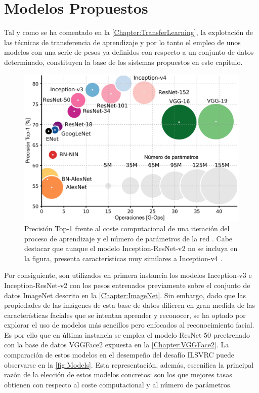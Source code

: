 \renewcommand{\itemautorefname}{Punto}

\chapter{Modelos Propuestos} \label{Chapter:5}

Tal y como se ha comentado en la \autoref{Chapter:TransferLearning}, la explotación de las técnicas de transferencia de aprendizaje y por lo tanto el empleo de unos modelos con una serie de pesos ya definidos con respecto a un conjunto de datos determinado, constituyen la base de los sistemas propuestos en este capítulo.

\begin{figure}
    \centering
    \includegraphics[scale=0.25]{Images/Models.png}
    \caption{Precisión Top-1 frente al coste computacional de una iteración del proceso de aprendizaje y el número de parámetros de la red \cite{Models}. Cabe destacar que aunque el modelo Inception-ResNet-v2 no se incluya en la figura, presenta características muy similares a Inception-v4 \cite{Inception-ResNet}.}
    \label{fig:Models}
\end{figure}

Por consiguiente, son utilizados en primera instancia los modelos Inception-v3 \cite{Inception-v3} e Inception-ResNet-v2 \cite{Inception-ResNet} con los pesos entrenados previamente sobre el conjunto de datos ImageNet descrito en la \autoref{Chapter:ImageNet}. Sin embargo, dado que las propiedades de las imágenes de esta base de datos difieren en gran medida de las características faciales que se intentan aprender y reconocer, se ha optado por explorar el uso de modelos más sencillos pero enfocados al reconocimiento facial. Es por ello que en última instancia se emplea el modelo ResNet-50 preetrenado con la base de datos VGGFace2 expuesta en la \autoref{Chapter:VGGFace2}. La comparación de estos modelos en el desempeño del desafío ILSVRC puede observarse en la \autoref{fig:Models}. Esta representación, además, escenifica la principal razón de la elección de estos modelos concretos: son los que mejores tasas obtienen con respecto al coste computacional y al número de parámetros.

